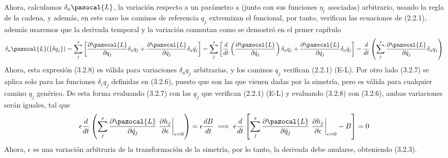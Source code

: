 Ahora, calculamos $\delta_a \pazocal{L}$, la variación respecto a un parámetro a (junto con sus funciones  $\eta_i$ asociadas) arbitrario, usando la regla de la cadena, y además, en este caso los caminos de referencia $q_j$ extremizan el funcional,  por tanto, verifican las ecuaciones de  (2.2.1), además usaremos que la derivada temporal y la variación conmutan como se demostró en el prmer capítulo
\begin{equation} \label{3.3.3}
    \delta_a \pazocal{L}(\{\delta q_j\}) =\sum_j^s \left[\frac{\partial \pazocal{L}}{\partial q_j} \delta_a q_j + \frac{\partial \pazocal{L}}{\partial \dot{q}_j} \delta_a \dot{q}_j\right] =\sum_j^s \left[\frac{d}{dt}\left(\frac{\partial \pazocal{L}}{\partial \dot{q}_j}\right) \delta_a q_j + \frac{\partial \pazocal{L}}{\partial \dot{q}_j} \delta_a \dot{q}_j\right] = \frac{d}{dt} \left(\sum_j^s \frac{\partial \pazocal{L}}{\partial \dot{q}_j} \delta_a q_j\right)
\end{equation} 
Ahora, esta expresión (3.2.8) es válida para variaciones $\delta_a q_j$ arbitrarias, y los caminos $q_j$ verifican (2.2.1) (E-L). Por otro lado (3.2.7) se aplica solo para las funciones  $\delta_\epsilon q_j$ definidas en (3.2.6), puesto que son las que vienen dadas por la simetría, pero es válida para cualquier camino $q_j$ genérico. De esta forma evaluando (3.2.7) con las $q_j$ que verifican (2.2.1) (E-L) y evaluando (3.2.8) con (3.2.6), ambas variaciones serán iguales, tal que
\begin{equation} \label{3.3.3}
    \epsilon \frac{d}{dt} \left(\sum_j^s \frac{\partial \pazocal{L}}{\partial \dot{q}_j}\left.\frac{\partial h_j}{\partial \epsilon}\right|_{\epsilon=0}\right) = \epsilon \frac{dB}{dt} \implies \epsilon \frac{d}{dt}\left[\sum_j^s \frac{\partial \pazocal{L}}{\partial \dot{q}_j} \left.\frac{\partial h_j}{\partial \epsilon}\right|_{\epsilon=0} - B \right] = 0
\end{equation} 
Ahora, $\epsilon$ es una variación arbitraria de la transformación de la simetría, por lo tanto, la derivada debe anularse, obteniendo (3.2.3).
